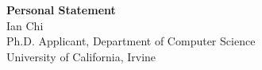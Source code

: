 \documentclass[11pt]{article}
\begin{document}
\begin{center}
    {\Large \textbf{Personal Statement}}\\[4pt]
    {\large Ian Chi}\\[2pt]
    Ph.D. Applicant, Department of Computer Science\\
    University of California, Irvine
\end{center}

\vspace{1em}

\end{document}
